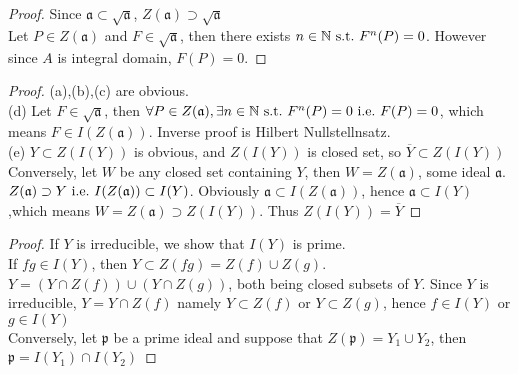 \documentclass[leqno]{ltjsarticle}
\begin{document}
\begin{proof}
	Since $\mathfrak a \subset \sqrt{\mathfrak a}$, $Z(\mathfrak a) \supset \sqrt{\mathfrak a}$\\
	Let $P\in Z(\mathfrak a)$ and $F \in \sqrt{\mathfrak a}$, then there exists $n\in\mathbb N\ \mathrm{s.t.}\  F^n(P) = 0$. However since $A$ is integral domain, $F(P)=0$.
\end{proof}
\begin{proof}
	(a),(b),(c) are obvious.\\
	(d)	Let $F\in\sqrt{\mathfrak a}$, then $\forall P\in Z(\mathfrak a),\exists n\in\mathbb N\ \mathrm{s.t.}\  F^n(P)=0\ \mathrm{i.e.}\  F(P)=0$, which means $F\in I(Z(\mathfrak a))$. Inverse proof is Hilbert Nullstellnsatz.\\
	(e) $Y \subset Z(I(Y))$ is obvious, and $Z(I(Y))$ is closed set, so $\overline Y \subset Z(I(Y))$\\
	Conversely, let $W$ be any closed set containing $Y$, then $W = Z(\mathfrak a)$, some ideal $\mathfrak a$. $Z(\mathfrak a) \supset Y \ \mathrm{i.e.}\  I(Z(\mathfrak a)) \subset I(Y)$. Obviously $\mathfrak a\subset I(Z(\mathfrak a))$, hence $\mathfrak a \subset I(Y)$ ,which means $W=Z(\mathfrak a) \supset Z(I(Y))$. Thus $Z(I(Y))=\overline Y$
\end{proof}

\begin{proof}
	If $Y$ is irreducible, we show that $I(Y)$ is prime.\\
	If $fg\in I(Y)$, then $Y\subset Z(fg) = Z(f)\cup Z(g)$. $Y = (Y\cap Z(f)) \cup (Y\cap Z(g))$, both being closed subsets of $Y$. Since $Y$ is irreducible, $Y = Y\cap Z(f)$ namely $Y\subset Z(f)$ or $Y\subset Z(g)$, hence $f\in I(Y)$ or $g\in I(Y)$\\
	Conversely, let $\mathfrak p$ be a prime ideal and suppose that $Z(\mathfrak p) = Y_1 \cup Y_2$, then $\mathfrak p = I(Y_1) \cap I(Y_2)$
\end{proof}



\mydef{
	
}
\end{document}
